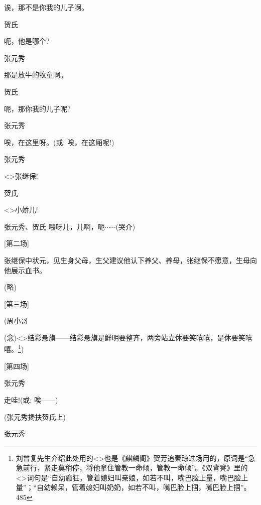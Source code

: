 诶，那不是你我的儿子啊。

贺氏\hspace{30pt}~

呃，他是哪个?

张元秀\hspace{20pt}~

那是放牛的牧童啊。

贺氏\hspace{30pt}~

呃，那你我的儿子呢?

张元秀\hspace{20pt}~

唉，在这里呀。({\akai 或}: 唉，在这厢呢!)

张元秀\hspace{20pt}~

\textless{}\!\textgreater{}张继保!

贺氏\hspace{30pt}~

\textless{}\!\textgreater{}小娇儿!

张元秀、贺氏 喂呀儿，儿啊，呃$\cdots{}\cdots{}$(哭介)

{{[}第二场{]}}

张继保中状元，见生身父母，生父建议他认下养父、养母，张继保不愿意，生母向他展示血书。

{(略)}

{{[}第三场{]}}

(周小哥

({\akai 念})\textless{}\!\textgreater{}结彩悬旗------结彩悬旗是鲜明要整齐，两旁站立休要笑嘻嘻，是休要笑嘻嘻。\footnote{ 刘曾复先生介绍此处用的\textless{}\!\textgreater{}也是《麒麟阁》贺芳追秦琼过场用的，原词是``急急前行，紧走莫稍停，将他拿住管教一命倾，管教一命倾''。《双背凳》里的\textless{}\!\textgreater{}词句是``自幼癫狂，管着媳妇叫亲娘，如若不叫，嘴巴脸上量，嘴巴脸上量''；``自幼赖呆，管着媳妇叫奶奶，如若不叫，嘴巴脸上掴，嘴巴脸上掴''。{485}})

{{[}第四场{]}}

张元秀\hspace{20pt}~

走哇!({\akai 或}: 唉------)

(张元秀搀扶贺氏上)

张元秀\hspace{20pt}~


